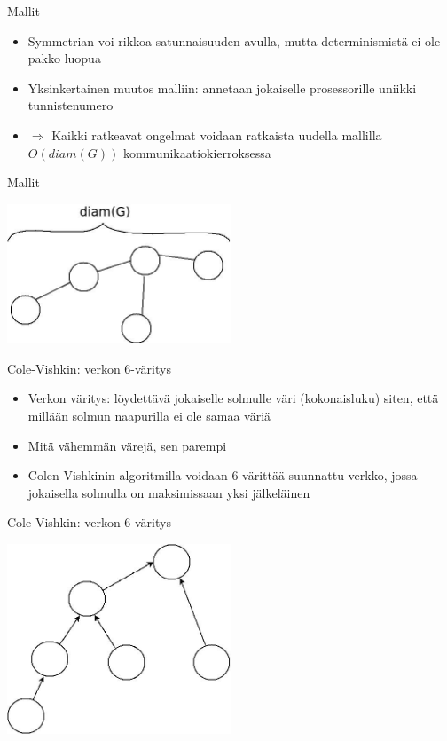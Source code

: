 \documentclass[a4paper, 12pt, finnish]{beamer}
\begin{document}
\begin{frame}{Mallit}
    \begin{itemize}
        \item Symmetrian voi rikkoa satunnaisuuden avulla, mutta determinismistä ei ole pakko luopua
        \item Yksinkertainen muutos malliin: annetaan jokaiselle prosessorille uniikki tunnistenumero
        \item $\Rightarrow$ Kaikki ratkeavat ongelmat voidaan ratkaista uudella mallilla $O(diam(G))$ kommunikaatiokierroksessa
    \end{itemize}
\end{frame}

\begin{frame}{Mallit}
    \begin{center} 
        \includegraphics[width=0.5\textwidth]{Diagram1.jpeg} 
    \end{center} 
\end{frame}

\begin{frame}{Cole-Vishkin: verkon 6-väritys}
    \begin{itemize}
        \item Verkon väritys: löydettävä jokaiselle solmulle väri (kokonaisluku) siten, että millään solmun naapurilla ei ole samaa väriä
        \item Mitä vähemmän värejä, sen parempi
        \item Colen-Vishkinin algoritmilla voidaan 6-värittää suunnattu verkko, jossa jokaisella solmulla on maksimissaan yksi jälkeläinen
    \end{itemize}
\end{frame}

\begin{frame}{Cole-Vishkin: verkon 6-väritys}
    \begin{center} 
        \includegraphics[width=0.5\textwidth]{Diagram3.jpeg} 
    \end{center} 
\end{frame}
\end{document}
